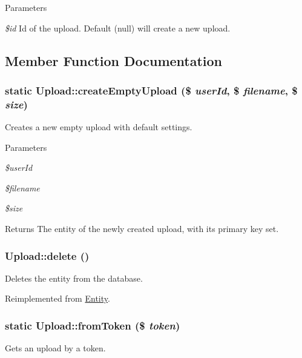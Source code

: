 \begin{DoxyParams}{Parameters}
\item[{\em \$id}]Id of the upload. Default (null) will create a new upload. \end{DoxyParams}


\subsection{Member Function Documentation}
\hypertarget{classUpload_a0d3a0940f5ba707968b9f1f132e05387}{
\subsubsection[{createEmptyUpload}]{\setlength{\rightskip}{0pt plus 5cm}static Upload::createEmptyUpload (\$ {\em userId}, \/  \$ {\em filename}, \/  \$ {\em size})}}
\label{classUpload_a0d3a0940f5ba707968b9f1f132e05387}
Creates a new empty upload with default settings.


\begin{DoxyParams}{Parameters}
\item[{\em \$userId}]\item[{\em \$filename}]\item[{\em \$size}]\end{DoxyParams}
\begin{DoxyReturn}{Returns}
The entity of the newly created upload, with its primary key set. 
\end{DoxyReturn}
\hypertarget{classUpload_a5e10f0433b44a7e78f5c2232e3d71aa4}{
\subsubsection[{delete}]{\setlength{\rightskip}{0pt plus 5cm}Upload::delete ()}}
\label{classUpload_a5e10f0433b44a7e78f5c2232e3d71aa4}
Deletes the entity from the database. 

Reimplemented from \hyperlink{classEntity_a59eae3c476f3996973400a024097c87e}{Entity}.

\hypertarget{classUpload_a3b66cb1b19e01380f8fa156bd1857b65}{
\subsubsection[{fromToken}]{\setlength{\rightskip}{0pt plus 5cm}static Upload::fromToken (\$ {\em token})}}
\label{classUpload_a3b66cb1b19e01380f8fa156bd1857b65}
Gets an upload by a token.


